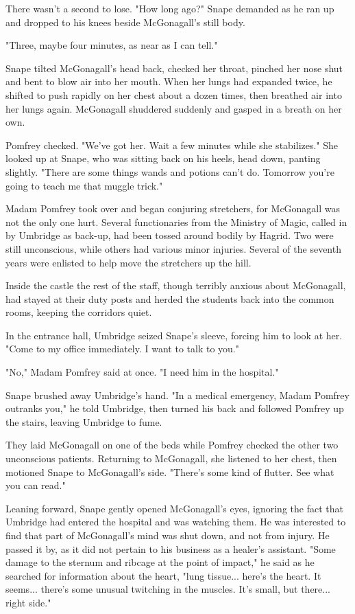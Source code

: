 \documentclass[a4paper,11pt]{article}
\begin{document}
There wasn't a second to lose. "How long ago?" Snape demanded as he ran up and dropped to his knees beside McGonagall's still body.

"Three, maybe four minutes, as near as I can tell."

Snape tilted McGonagall's head back, checked her throat, pinched her nose shut and bent to blow air into her mouth. When her lungs had expanded twice, he shifted to push rapidly on her chest about a dozen times, then breathed air into her lungs again. McGonagall shuddered suddenly and gasped in a breath on her own.

Pomfrey checked. "We've got her. Wait a few minutes while she stabilizes." She looked up at Snape, who was sitting back on his heels, head down, panting slightly. "There are some things wands and potions can't do. Tomorrow you're going to teach me that muggle trick."

Madam Pomfrey took over and began conjuring stretchers, for McGonagall was not the only one hurt. Several functionaries from the Ministry of Magic, called in by Umbridge as back-up, had been tossed around bodily by Hagrid. Two were still unconscious, while others had various minor injuries. Several of the seventh years were enlisted to help move the stretchers up the hill.

Inside the castle the rest of the staff, though terribly anxious about McGonagall, had stayed at their duty posts and herded the students back into the common rooms, keeping the corridors quiet.

In the entrance hall, Umbridge seized Snape's sleeve, forcing him to look at her. "Come to my office immediately. I want to talk to you."

"No," Madam Pomfrey said at once. "I need him in the hospital."

Snape brushed away Umbridge's hand. "In a medical emergency, Madam Pomfrey outranks you," he told Umbridge, then turned his back and followed Pomfrey up the stairs, leaving Umbridge to fume.

They laid McGonagall on one of the beds while Pomfrey checked the other two unconscious patients. Returning to McGonagall, she listened to her chest, then motioned Snape to McGonagall's side. "There's some kind of flutter. See what you can read."

Leaning forward, Snape gently opened McGonagall's eyes, ignoring the fact that Umbridge had entered the hospital and was watching them. He was interested to find that part of McGonagall's mind was shut down, and not from injury. He passed it by, as it did not pertain to his business as a healer's assistant. "Some damage to the sternum and ribcage at the point of impact," he said as he searched for information about the heart, "lung tissue... here's the heart. It seems... there's some unusual twitching in the muscles. It's small, but there... right side."
\end{document}
